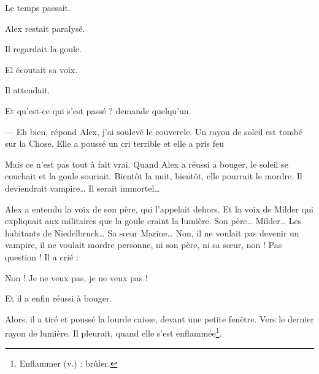 Le temps passait.

Alex restait paralysé.

Il regardait la goule.

El écoutait sa voix.

Il attendait.

\og Et qu'est-ce qui s'est passé ? demande quelqu'un.

--- Eh bien, répond Alex, j'ai soulevé le couvercle. Un rayon de soleil est tombé sur la Chose. Elle a poussé un cri terrible et
    elle a pris feu \fg{}

Mais ce n'est pas tout à fait vrai. Quand Alex a réussi a bouger, le soleil se couchait et la goule souriait. Bientôt la nuit,
bientôt, elle pourrait le mordre. Il deviendrait vampire\ldots{} Il serait immortel\ldots{}

Alex a entendu la voix de son père, qui l'appelait dehors. Et la voix de Milder qui expliquait aux militaires que la goule craint
la lumière. Son père\ldots{} Milder\ldots{} Les habitants de Niedelbruck\ldots{} Sa s\oe{}ur Marine\ldots{} Non, il ne voulait pas
devenir un vampire, il ne voulait mordre personne, ni son père, ni sa s\oe{}ur, non ! Pas question ! Il a crié :

\og Non ! Je ne veux pas, je ne veux pas ! \fg{}

Et il a enfin réussi à bouger.

Alors, il a tiré et poussé la lourde caisse, devant une petite fenêtre. Vers le dernier rayon de lumière. Il pleurait, quand elle
s'est enflammée\footnote{Enflammer (v.) : brûler.}.

